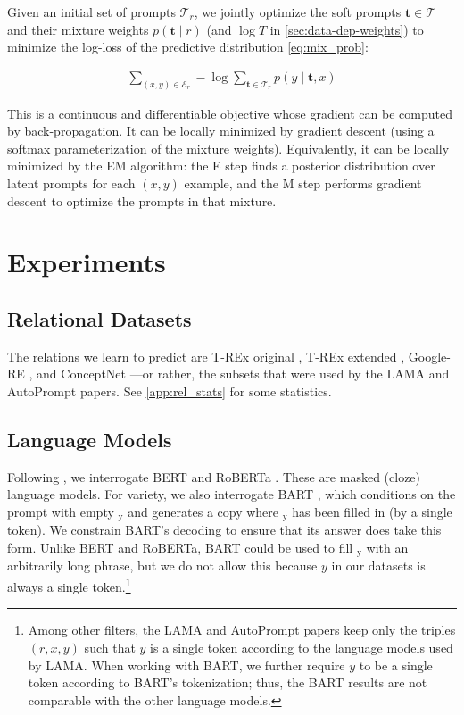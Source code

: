 Given an initial set of prompts $\mathcal{T}_r$, we jointly optimize the soft prompts $\mathbf{t} \in \mathcal{T}$ and their mixture weights $p(\mathbf{t} \mid r)$ (and $\log T$ in \ref{sec:data-dep-weights}) to minimize the log-loss of the predictive distribution \eqref{eq:mix_prob}:

\begin{align}
    \sum_{(x,y) \in \mathcal{E}_r} -\log \sum_{\mathbf{t} \in \mathcal{T}_r} p(y \mid \mathbf{t}, x)
    \label{eq:objective}
\end{align}

This is a continuous and differentiable objective whose gradient can be computed by back-propagation.  It can be locally minimized by gradient descent (using a softmax parameterization of the mixture weights). Equivalently, it can be locally minimized by the EM algorithm: the E step finds a posterior distribution over latent prompts for each $(x,y)$ example, and the M step performs gradient descent to optimize the prompts in that mixture.

\section{Experiments}

\subsection{Relational Datasets} 

The relations we learn to predict are T-REx original \citep{elsaharTRExLargeScale2018},  T-REx extended \citep{shinAutoPromptElicitingKnowledge2020}, Google-RE \citep{google-re}, and ConceptNet \citep{speerConceptNetOpenMultilingual2017}---or rather, the subsets that were used by the LAMA and AutoPrompt papers. See \ref{app:rel_stats} for some statistics.

\subsection{Language Models} 

Following \citet{petroniLanguageModelsKnowledge2019}, we interrogate BERT  \citep{devlinBERTPretrainingDeep2019} and RoBERTa  \citep{liuRoBERTaRobustlyOptimized2019}. These are masked (cloze) language models. For variety, we also interrogate BART \citep{lewisBARTDenoisingSequencetoSequence2020}, which conditions on the prompt with empty \underline{}$\!_\mathrm{y}$ and generates a copy where \underline{}$\!_\mathrm{y}$ has been filled in (by a single token).  We constrain BART's decoding to ensure that its answer does take this form.  Unlike BERT and RoBERTa, BART could be used to fill \underline{}$\!_\mathrm{y}$ with an arbitrarily long phrase, but we do not allow this because $y$ in our datasets is always a single token.\footnote{Among other filters, the LAMA and AutoPrompt papers keep only the triples $(r,x,y)$ such that $y$ is a single token according to the language models used by LAMA.  When working with BART, we further require $y$ to be a single token according to BART's tokenization; thus, the BART results are not comparable with the other language models.}

